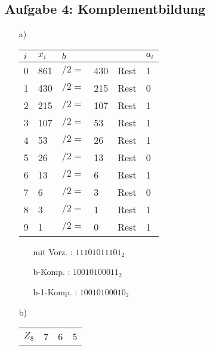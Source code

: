 \documentclass{article}
\begin{document}
    \subsection*{Aufgabe 4: Komplementbildung}
    \begin{enumerate}
        \item[a)] 
        \begin{minipage}[t]{0.5\textwidth}
            \begin{tabular}[t]{llllll}
                $i$ & $x_i$ & $b$       &       &       & $a_i$ \\
                \hline 
                0   & 861   & $/2 = $   & 430    & Rest  & 1 \\
                1   & 430   & $/2 = $   & 215    & Rest  & 0 \\
                2   & 215   & $/2 = $   & 107    & Rest  & 1 \\
                3   & 107   & $/2 = $   & 53     & Rest  & 1 \\
                4   & 53    & $/2 = $   & 26     & Rest  & 1 \\
                5   & 26    & $/2 = $   & 13     & Rest  & 0 \\
                6   & 13    & $/2 = $   & 6      & Rest  & 1 \\
                7   & 6     & $/2 = $   & 3      & Rest  & 0 \\
                8   & 3     & $/2 = $   & 1      & Rest  & 1 \\
                9   & 1     & $/2 = $   & 0      & Rest  & 1
            \end{tabular}
        \end{minipage}
        \begin{minipage}[t]{0.4\textwidth}
            \begin{enumerate}
                \item[mit Vorz.]: $11101011101_2$
                \item[b-Komp.]: $10010100011_2$
                \item[b-1-Komp.]: $10010100010_2$
            \end{enumerate}
        \end{minipage}
        \item[b)]
        \begin{minipage}[t]{0.5\textwidth}
            \begin{tabular}[t]{l|ccc}  
                $Z_{8}$ & 7   & 6   & 5   \\

\end{tabular}
\end{minipage}
\end{enumerate}
\end{document}

